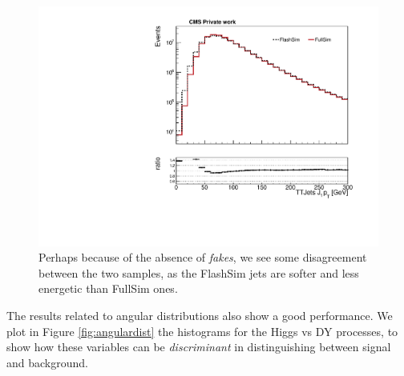 \begin{figure}
    \centering
    \includegraphics[width=\linewidth]{gfx/ch6/TTJets_J1_pt____log.pdf}
    \caption[J$_1$ $p_T$]{Perhaps because of the absence of \emph{fakes}, we see some disagreement between the two samples, as the FlashSim jets are softer and less energetic than FullSim ones.}
    \label{fig:j1pt}
\end{figure}

The results related to angular distributions also show a good performance. We plot in Figure \ref{fig:angulardist} the histograms for the Higgs vs DY processes, to show how these variables can be \emph{discriminant} in distinguishing between signal and background.

